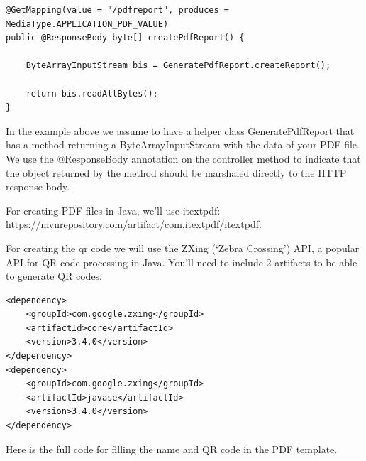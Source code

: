 \begin{lstlisting}
@GetMapping(value = "/pdfreport", produces = MediaType.APPLICATION_PDF_VALUE)
public @ResponseBody byte[] createPdfReport() {

    ByteArrayInputStream bis = GeneratePdfReport.createReport();

	return bis.readAllBytes();
}
\end{lstlisting}

In the example above we assume to have a helper class GeneratePdfReport that has a method returning a ByteArrayInputStream with the data of your PDF file. We use the @ResponseBody annotation on the controller method to indicate that the object returned by the method should be marshaled directly to the HTTP response body.

For creating PDF files in Java, we'll use itextpdf: \url{https://mvnrepository.com/artifact/com.itextpdf/itextpdf}.

For creating the qr code we will use the ZXing (`Zebra Crossing') API, a popular API for QR code processing in Java. You'll need to include 2 artifacts to be able to generate QR codes.

\begin{lstlisting}
<dependency>
	<groupId>com.google.zxing</groupId>
	<artifactId>core</artifactId>
	<version>3.4.0</version>
</dependency>
<dependency>
	<groupId>com.google.zxing</groupId>
	<artifactId>javase</artifactId>
	<version>3.4.0</version>
</dependency>
\end{lstlisting}

Here is the full code for filling the name and QR code in the PDF template.

